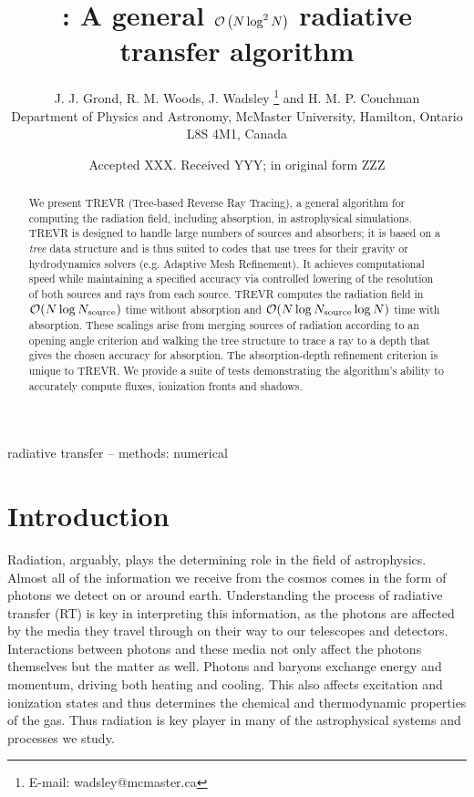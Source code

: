 \documentclass[fleq,usenatbib]{mnras}
\title[]{\acro{}: A general $\mathcal{O}\left(N\log^2N\right)$ radiative transfer algorithm}
\author[J. J. Grond et al.]{
J. J. Grond,
R. M. Woods,
J. Wadsley \thanks{E-mail:  wadsley@mcmaster.ca}
and H. M. P. Couchman
\\
Department of Physics and Astronomy, McMaster University, Hamilton, Ontario L8S
 4M1, Canada}
\date{Accepted XXX. Received YYY; in original form ZZZ}
\newcommand{\acro}{TREVR}
\newcommand{\NS}{N_{\rm source}}
\begin{document}
\label{firstpage}
\pagerange{\pageref{firstpage}--\pageref{lastpage}}
\maketitle

\begin{abstract}
We present \acro{} (Tree-based Reverse Ray Tracing), a general algorithm for 
computing the radiation field, including absorption, in astrophysical 
simulations. \acro{} is designed to handle large numbers of sources and 
absorbers; it is based on a \emph{tree} data structure and is thus suited 
to codes that use trees for their gravity or hydrodynamics solvers (e.g. 
Adaptive Mesh Refinement). It achieves computational speed while maintaining a 
specified accuracy via controlled lowering of the resolution of both sources and 
rays from each source. \acro{} computes the radiation field in $\mathcal{O}(N 
\log \NS)$ time without absorption and $\mathcal{O}(N \log \NS \log{N})$ time 
with absorption.  These scalings arise from merging sources of radiation 
according to an opening angle criterion and walking the tree structure to 
trace a ray to a depth that gives the chosen accuracy for absorption. The 
absorption-depth refinement criterion is unique to \acro{}. We provide a suite 
of tests demonstrating the algorithm's ability to accurately compute fluxes, 
ionization fronts and shadows.   

\end{abstract}

\begin{keywords}
radiative transfer -- methods: numerical
\end{keywords}



\section{Introduction}\label{sec:intr}
Radiation, arguably, plays the determining role in the field of astrophysics. 
Almost all of the information we receive from the cosmos comes in the form of 
photons we detect on or around earth. Understanding the process of radiative 
transfer (RT) is key in interpreting this information, as the photons are 
affected by the media they travel through on their way to our telescopes and 
detectors. Interactions between photons and these media not only affect the 
photons themselves but the matter as well. Photons and baryons exchange energy 
and momentum, driving both heating and cooling. This also affects excitation 
and ionization states and thus determines the chemical and thermodynamic 
properties of the gas. Thus radiation is key player in many of the 
astrophysical systems and processes we study.
\end{document}
